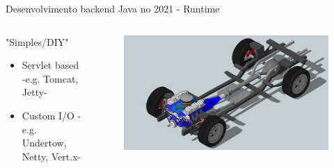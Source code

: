 \documentclass[aspectratio=169]{beamer}
\begin{document}
\begin{frame}{Desenvolvimento backend Java no 2021 - Runtime}

\begin{columns}
\begin{column}{0.5\textwidth}
"Simples/DIY"
\begin{itemize}
\item Servlet based -e.g. Tomcat, Jetty-
\item Custom I/O -e.g. Undertow, Netty, Vert.x-
\end{itemize}
\end{column}
\begin{column}{0.5\textwidth}  %
\begin{figure}
	\centering
	\includegraphics[width=0.9\linewidth]{Images/chassis}
\end{figure}
\end{column}
\end{columns}

\end{frame}
\end{document}

